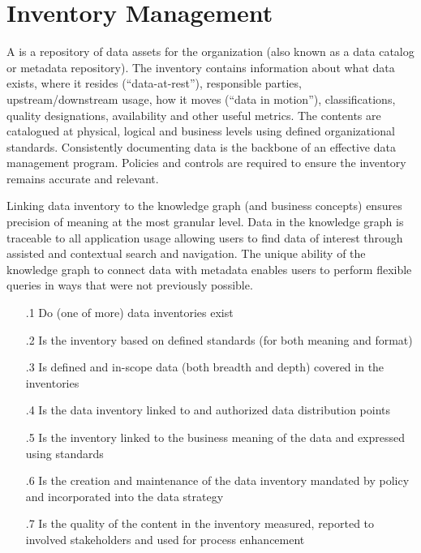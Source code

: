 \section{Inventory Management}\label{sec:ekgmm-b-2-3} %

A  is a repository of data assets for the organization (also known as a
data catalog or metadata repository).
The inventory contains information about what data exists, where it resides (“data-at-rest”),
responsible parties, upstream/downstream usage, how it moves (“data in motion”), classifications,
quality designations, availability and other useful metrics.
The contents are catalogued at physical, logical and business levels using defined organizational standards.
Consistently documenting data is the backbone of an effective data management program.
Policies and controls are required to ensure the inventory remains accurate and relevant.

\kgmmekgrationalesection

Linking data inventory to the knowledge graph (and business concepts) ensures precision of meaning at the most
granular level.
Data in the knowledge graph is traceable to all application usage allowing users to find data of interest through
assisted and contextual search and navigation.
The unique ability of the knowledge graph to connect data with metadata enables users to perform flexible queries
in ways that were not previously possible.

\kgmmcorequestionssection

\begin{itemize}[leftmargin=.5in]

  \item [\thesection.1] Do (one of more) data inventories exist
  \item [\thesection.2] Is the inventory based on defined standards (for both meaning and format)
  \item [\thesection.3] Is defined and in-scope data (both breadth and depth) covered in the inventories
  \item [\thesection.4] Is the data inventory linked to  and authorized data distribution points
  \item [\thesection.5] Is the inventory linked to the business meaning of the data and expressed using standards
  \item [\thesection.6] Is the creation and maintenance of the data inventory mandated by policy and incorporated
                        into the data strategy
  \item [\thesection.7] Is the quality of the content in the inventory measured, reported to involved stakeholders
                        and used for process enhancement

\end{itemize}

